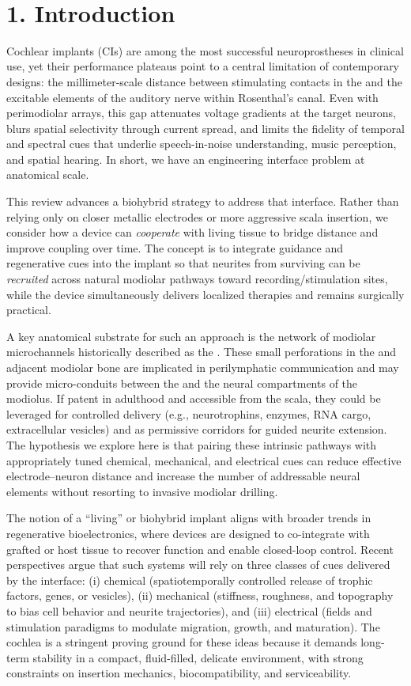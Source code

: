 \
\section*{1. Introduction}

Cochlear implants (CIs) are among the most successful neuroprostheses in clinical use, yet their performance plateaus point to a central limitation of contemporary designs: the millimeter-scale distance between stimulating contacts in the \ST and the excitable elements of the auditory nerve within Rosenthal's canal. Even with perimodiolar arrays, this gap attenuates voltage gradients at the target neurons, blurs spatial selectivity through current spread, and limits the fidelity of temporal and spectral cues that underlie speech-in-noise understanding, music perception, and spatial hearing. In short, we have an engineering interface problem at anatomical scale.

This review advances a biohybrid strategy to address that interface. Rather than relying only on closer metallic electrodes or more aggressive scala insertion, we consider how a device can \emph{cooperate} with living tissue to bridge distance and improve coupling over time. The concept is to integrate guidance and regenerative cues into the implant so that neurites from surviving \SGNs can be \emph{recruited} across natural modiolar pathways toward recording/stimulation sites, while the device simultaneously delivers localized therapies and remains surgically practical.

A key anatomical substrate for such an approach is the network of modiolar microchannels historically described as the \CPS. These small perforations in the \OSL and adjacent modiolar bone are implicated in perilymphatic communication and may provide micro-conduits between the \ST and the neural compartments of the modiolus. If patent in adulthood and accessible from the scala, they could be leveraged for controlled delivery (e.g., neurotrophins, enzymes, RNA cargo, extracellular vesicles) and as permissive corridors for guided neurite extension. The hypothesis we explore here is that pairing these intrinsic pathways with appropriately tuned chemical, mechanical, and electrical cues can reduce effective electrode--neuron distance and increase the number of addressable neural elements without resorting to invasive modiolar drilling.

The notion of a ``living'' or biohybrid implant aligns with broader trends in regenerative bioelectronics, where devices are designed to co-integrate with grafted or host tissue to recover function and enable closed-loop control. Recent perspectives argue that such systems will rely on three classes of cues delivered by the interface: (i) chemical (spatiotemporally controlled release of trophic factors, genes, or vesicles), (ii) mechanical (stiffness, roughness, and topography to bias cell behavior and neurite trajectories), and (iii) electrical (fields and stimulation paradigms to modulate migration, growth, and maturation).\citep{CarnicerLombarte2024AdvMat} The cochlea is a stringent proving ground for these ideas because it demands long-term stability in a compact, fluid-filled, delicate environment, with strong constraints on insertion mechanics, biocompatibility, and serviceability.

